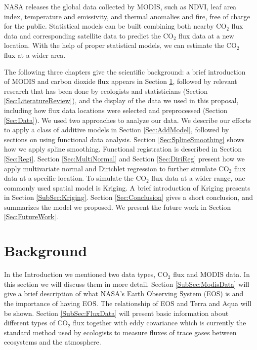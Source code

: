 \documentclass{article}
\begin{document}
NASA releases the  global data collected by MODIS,  such as NDVI,  leaf area index, temperature and emissivity, and thermal anomalies and fire, free of charge for the public.  Statistical models can be built combining both nearby CO$_2$ flux data and corresponding satellite data to predict the CO$_2$ flux data at a new location. With the help of proper statistical models, we can estimate the CO$_2$ flux at a wider area.

\smallskip

The following three chapters give the scientific background: 
 a brief introduction of MODIS and carbon dioxide flux appears in Section \ref{Sec:Background}, followed by relevant research that has been done by ecologists and statisticians (Section \ref{Sec:LiteratureReview}), and the display of the data we used in this proposal, including how flux data locations were selected and preprocessed (Section \ref{Sec:Data}).
We used two approaches to analyze our data. 
We describe our efforts to apply a class of additive models in Section \ref{Sec:AddModel}, followed by sections on using functional data analysis. 
Section \ref{Sec:SplineSmoothing} shows how we apply spline smoothing. Functional registration is described in Section \ref{Sec:Regi}. Section \ref{Sec:MultiNormal} and Section \ref{Sec:DiriReg} present  how we apply multivariate normal and Dirichlet regression to further simulate CO$_2$ flux data at a specific location.  
To simulate the CO$_2$ flux data at a wider range, one commonly used spatial model is Kriging. A brief introduction of Kriging presents in Section \ref{SubSec:Kriging}.
Section \ref{Sec:Conclusion} gives a short conclusion, and summarizes the model we proposed. 
We present the future work in Section \ref{Sec:FutureWork}.

\bigskip


\section{Background}\label{Sec:Background}

In the Introduction we mentioned two data types, CO$_2$ flux and MODIS data. In this section we will discuss them in more detail. 
Section \ref{SubSec:ModisData} will give a brief description of what NASA's Earth Observing System (EOS) is and the importance of having EOS. The relationship of EOS and Terra and Aqua will be shown. 
Section \ref{SubSec:FluxData} will present basic information about different types of CO$_2$ flux together with eddy covariance which is currently the standard method used by ecologists to measure fluxes of trace gases between ecosystems and the atmosphere. 
\end{document}
